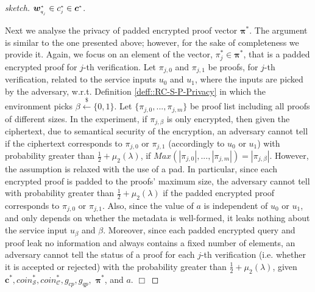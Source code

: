 \begin{proof}[sketch]
$\bm{w}^{\scriptscriptstyle *}_{\scriptscriptstyle q_{_{\scaleto{j}{\size}}}}\in c^{\scriptscriptstyle *}_{\scriptscriptstyle j}\in\bm{c}^{\scriptscriptstyle *}$. 

Next we analyse the privacy of padded encrypted proof vector $\bm{\pi}^{\scriptscriptstyle *}$. The argument is similar to the one presented above; however, for  the sake of completeness we provide it.  Again, we focus on an element of the vector,  $\pi_{\scriptscriptstyle j}^{\scriptscriptstyle *}\in\bm{\pi}^{\scriptscriptstyle *}$, that is a padded encrypted proof for $j$-th verification. Let $\pi_{\scriptscriptstyle j,0}$ and $\pi_{\scriptscriptstyle j,1}$  be proofs, for $j$-th verification, related to the service inputs $u_{\scriptscriptstyle 0}$ and $u_{\scriptscriptstyle 1}$, where the inputs   are picked by the adversary, w.r.t. Definition  \ref{deff::RC-S-P-Privacy} in which  the environment picks $\beta\stackrel{\scriptscriptstyle\$}\leftarrow \{0,1\}$.  Let $\{\pi_{\scriptscriptstyle j,0},...,\pi_{\scriptscriptstyle j,m}\}$ be proof list including all proofs of different sizes. In the experiment, if $\pi_{\scriptscriptstyle j,\beta}$  is only   encrypted, then given the ciphertext, due to semantical security of the encryption, an adversary cannot tell if the ciphertext corresponds to $\pi_{\scriptscriptstyle j,0}$ or $\pi_{\scriptscriptstyle j,1}$  (accordingly to $u_{\scriptscriptstyle 0}$ or $u_{\scriptscriptstyle 1}$) with probability greater than $\frac{1}{2}+\mu_{\scriptscriptstyle 2}(\lambda)$,  if $Max(|\pi_{\scriptscriptstyle j,0}|,...,|\pi_{\scriptscriptstyle j,m}|)=|\pi_{\scriptscriptstyle j,\beta}|$. However, the  assumption is  relaxed with the use of a pad. In particular, since each encrypted proof is padded  to the proofs' maximum size, the adversary cannot tell with probability greater than $\frac{1}{2}+\mu_{\scriptscriptstyle 2}(\lambda)$ if the  padded encrypted proof corresponds to  $\pi_{\scriptscriptstyle j,0}$ or $\pi_{\scriptscriptstyle j,1}$. Also, since the value of $a$ is independent of $u_{\scriptscriptstyle 0}$  or $u_{\scriptscriptstyle 1}$, and only depends on whether the metadata is well-formed, it leaks nothing about the service input $u_{\scriptscriptstyle\beta}$ and $\beta$. Moreover, since each padded encrypted query and proof leak no information and always contains a fixed number of elements, an adversary cannot tell the status of a proof for each $j$-th verification (i.e. whether it is accepted or rejected) with the probability greater than $\frac{1}{2}+\mu_{\scriptscriptstyle 2}(\lambda)$, given  $\bm{c}^{\scriptscriptstyle *},coin^{\scriptscriptstyle *}_{\scriptscriptstyle \mathcal S},coin^{\scriptscriptstyle *}_{\scriptscriptstyle\mathcal C}, g_{\scriptscriptstyle cp},  g_{\scriptscriptstyle qp},$  $\bm{\pi}^{\scriptscriptstyle *}$, and $a$.
  \hfill\(\Box\)\end{proof}


